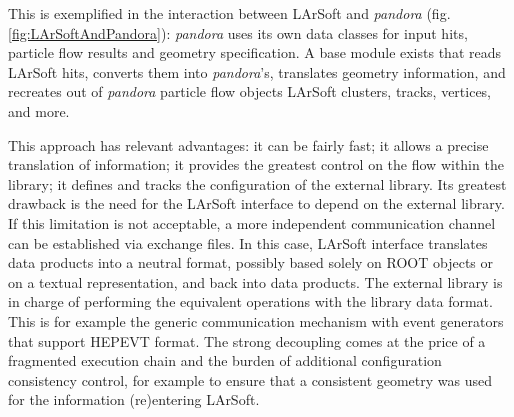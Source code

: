 This is exemplified in the interaction between LArSoft and
\emph{pandora} (fig. \ref{fig:LArSoftAndPandora}): \emph{pandora} uses
its own data classes for input hits, particle flow results and geometry
specification. A base module exists that reads LArSoft hits, converts
them into \emph{pandora}'s, translates geometry information, and
recreates out of \emph{pandora} particle flow objects LArSoft clusters,
tracks, vertices, and more.

This approach has relevant advantages: it can be fairly fast; it allows
a precise translation of information; it provides the greatest control
on the flow within the library; it defines and tracks the configuration
of the external library. Its greatest drawback is the need for the
LArSoft interface to depend on the external library. If this limitation
is not acceptable, a more independent communication channel can be
established via exchange files. In this case, LArSoft interface
translates data products into a neutral format, possibly based solely on
ROOT objects or on a textual representation, and back into data
products. The external library is in charge of performing the equivalent
operations with the library data format. This is for example the generic
communication mechanism with event generators that support HEPEVT
format. The strong decoupling comes at the price of a fragmented
execution chain and the burden of additional configuration consistency
control, for example to ensure that a consistent geometry was used for
the information (re)entering LArSoft.
